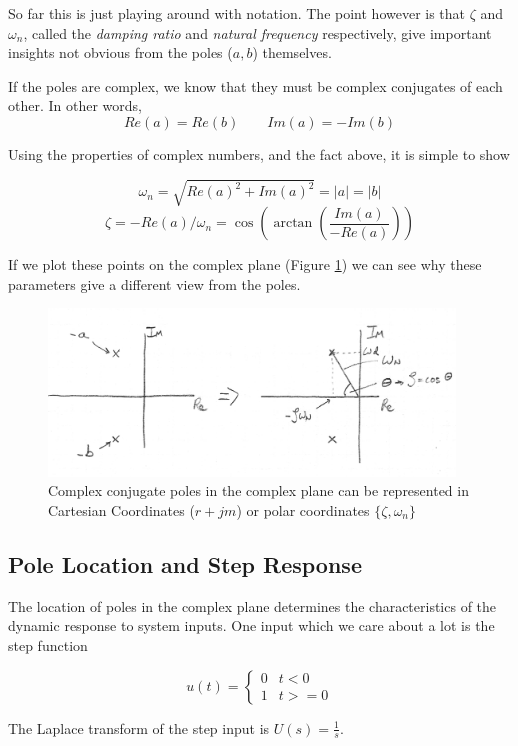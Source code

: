 So far this is just playing around with notation.  The point  however is that $\zeta$ and $\omega_n$, called the {\it damping ratio} and {\it natural frequency} respectively, give important insights not obvious from the poles ($a,b$) themselves.

If the poles are complex, we know that they must  be complex conjugates of each other. In other words,
\[
Re(a) = Re(b) \qquad Im(a) = -Im(b)
\]

Using the properties of complex numbers, and the fact above, it is simple to show

\[
\omega_n = \sqrt{Re(a)^2 + Im(a)^2} = |a| = |b|
\]
\[
\zeta = -Re(a)/\omega_n = \cos\left(\arctan\left(\frac{Im(a)}{-Re(a)}\right)\right)
\]

If we plot these points on the complex plane (Figure \ref{ccpoleszeta}) we can see why these parameters give a different view from the poles.


\begin{figure}\centering
 \includegraphics[width=4.25in]{figs05/00733a.png}
\caption{Complex conjugate poles in the complex plane can be represented in Cartesian Coordinates ($r+jm$) or polar coordinates $\{\zeta, \omega_n\}$}\label{ccpoleszeta}
\end{figure}

\subsection{Pole Location and Step Response}

The location of poles in the complex plane determines the characteristics of the dynamic response to system inputs.  One input which we care about a lot is the step function

\[
u(t) = \left \{ \begin{array}{cc} 0 & t< 0 \\ 1 & t >= 0 \end{array} \right .
\]

The Laplace transform of the step input is $U(s) = \frac{1}{s}$.

